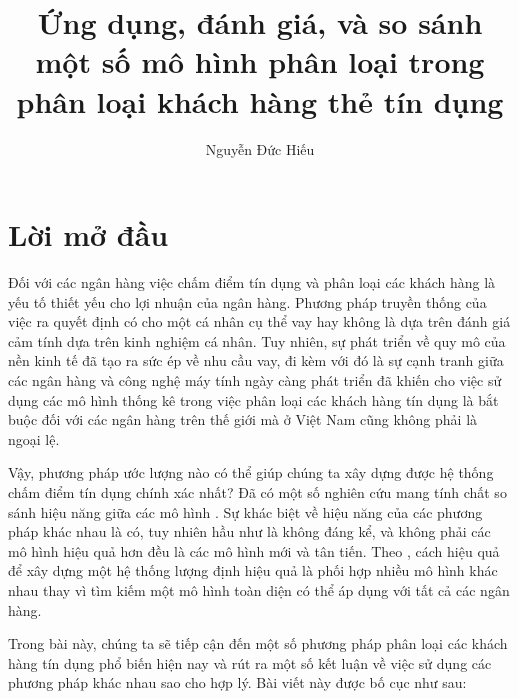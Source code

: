 \documentclass[a4paper]{report}\usepackage[]{graphicx}\usepackage[]{color}
\title{Ứng dụng, đánh giá, và so sánh một số mô hình phân loại trong phân loại khách hàng thẻ tín dụng}\let\Title\@title
\author{Nguyễn Đức Hiếu}\let\Author\@author
\begin{document}


\clearpage\tableofcontents
{}

\listoftables
{}

\listoffigures
{}

\chapter*{Lời mở đầu}

%
Đối với các ngân hàng việc chấm điểm tín dụng và phân loại các khách hàng là yếu tố thiết yếu cho lợi nhuận của ngân hàng.
%
Phương pháp truyền thống của việc ra quyết định có cho một cá nhân cụ thể vay hay không là dựa trên đánh giá cảm tính dựa trên kinh nghiệm cá nhân.
%
Tuy nhiên, sự phát triển về quy mô của nền kinh tế đã tạo ra sức ép về nhu cầu vay, đi kèm với đó là sự cạnh tranh giữa các ngân hàng và công nghệ máy tính ngày càng phát triển đã khiến cho việc sử dụng các mô hình thống kê trong việc phân loại các khách hàng tín dụng là bắt buộc đối với các ngân hàng trên thế giới mà ở Việt Nam cũng không phải là ngoại lệ.
%

Vậy, phương pháp ước lượng nào có thể giúp chúng ta xây dựng được hệ thống chấm điểm tín dụng chính xác nhất? Đã có một số nghiên cứu mang tính chất so sánh hiệu năng giữa các mô hình \parencite{baesens2003benchmarking, xiao2006comparative, lessmann2015benchmarking}. 
Sự khác biệt về hiệu năng của các phương pháp khác nhau là có, tuy nhiên hầu như là không đáng kể, và không phải các mô hình hiệu quả hơn đều là các mô hình mới và tân tiến.
Theo \textcite{thomas2010consumer}, cách hiệu quả để xây dựng một hệ thống lượng định hiệu quả là phối hợp nhiều mô hình khác nhau thay vì tìm kiếm một mô hình toàn diện có thể áp dụng với tất cả các ngân hàng.

Trong bài này, chúng ta sẽ tiếp cận đến một số phương pháp phân loại các khách hàng tín dụng phổ biến hiện nay và rút ra một số kết luận về việc sử dụng các phương pháp khác nhau sao cho hợp lý. Bài viết này được bố cục như sau:
\end{document}
